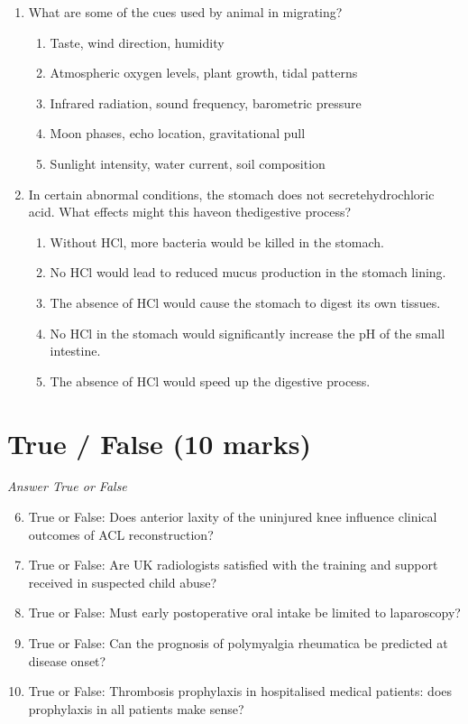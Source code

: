 \documentclass[12pt]{article}
\begin{document}
\begin{enumerate}[label=\arabic*.]
\begin{enumerate}[label=(\alph*)]
\end{enumerate}
\item What are some of the cues used by animal in migrating?
\begin{enumerate}[label=(\alph*)]
    \item Taste, wind direction, humidity
    \item Atmospheric oxygen levels, plant growth, tidal patterns
    \item Infrared radiation, sound frequency, barometric pressure
    \item Moon phases, echo location, gravitational pull
    \item Sunlight intensity, water current, soil composition
\end{enumerate}
\item In certain abnormal conditions, the stomach does not secretehydrochloric acid. What effects might this haveon thedigestive process?
\begin{enumerate}[label=(\alph*)]
    \item Without HCl, more bacteria would be killed in the stomach.
    \item No HCl would lead to reduced mucus production in the stomach lining.
    \item The absence of HCl would cause the stomach to digest its own tissues.
    \item No HCl in the stomach would significantly increase the pH of the small intestine.
    \item The absence of HCl would speed up the digestive process.
\end{enumerate}
\end{enumerate}

\section*{True / False (10 marks)}
\textit{Answer True or False}
\begin{enumerate}[label=\arabic*.]
\setcounter{enumi}{5}
\item True or False: Does anterior laxity of the uninjured knee influence clinical outcomes of ACL reconstruction?
\item True or False: Are UK radiologists satisfied with the training and support received in suspected child abuse?
\item True or False: Must early postoperative oral intake be limited to laparoscopy?
\item True or False: Can the prognosis of polymyalgia rheumatica be predicted at disease onset?
\item True or False: Thrombosis prophylaxis in hospitalised medical patients: does prophylaxis in all patients make sense?
\end{enumerate}
\end{document}
